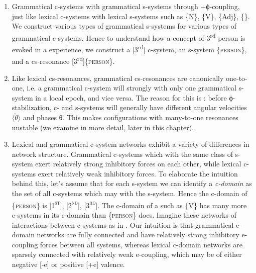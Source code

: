 \begin{enumerate}\sloppy

\item Grammatical c-systems  with grammatical s-systems through +ϕ-coupling, just like lexical c-systems  with lexical s-systems such as \{N\}, \{V\}, \{Adj\}, \{\}. We construct various types of grammatical s-systems for various types of grammatical c-systems. Hence to understand how a concept of 3\textsuperscript{rd} person is evoked in a  experience, we construct a [3\textsuperscript{rd}] c-system, an s-system \{\textsc{person}\}, and a cs-resonance [3\textsuperscript{rd}]\{\textsc{person}\}. 

\item Like lexical cs-resonances, grammatical cs-resonances are canonically one-to-one, i.e. a grammatical c-system will strongly  with only one grammatical s-system in a local epoch, and vice versa. The reason for this is : before ϕ-stabilization, c- and s-systems will generally have different angular velocities $\langle\dot{\theta}\rangle$ and phases θ. This makes configurations with many-to-one resonances unstable (we examine  in more detail, later in this chapter).

\item Lexical and grammatical c-system networks exhibit a variety of differences in network structure. Grammatical c-systems which  with the same class of s-system exert relatively strong inhibitory forces on each other, while lexical c-systems exert relatively weak inhibitory forces. To elaborate the intuition behind this, let's assume that for each s-system we can identify a \textit{c-domain} as the set of all c-systems which may  with the s-system. Hence the c-domain of \{\textsc{person}\} is [1\textsc{\textsuperscript{st}}], [2\textsc{\textsuperscript{nd}}], [3\textsc{\textsuperscript{rd}}]. The c-domain of a  such as \{V\} has many more c-systems in its c-domain than \{\textsc{person}\} does. Imagine these networks of interactions between c-systems as in {}. Our intuition is that grammatical c-domain networks are fully connected and have relatively strong inhibitory e-coupling forces between all systems, whereas lexical c-domain networks are sparsely connected with relatively weak e-coupling, which may be of either negative [-e] or positive [+e] valence.


\end{enumerate}
